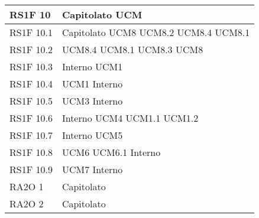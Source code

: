 \begin{center}
\begin{longtable}{ | p{5cm} | p{5cm} |}
        RS1F 10 &  Capitolato \newline  UCM \newline  \\ \hline      
        RS1F 10.1 &  Capitolato \newline  UCM8 \newline  UCM8.2 \newline  UCM8.4 \newline  UCM8.1 \newline  \\ \hline      
        RS1F 10.2 &  UCM8.4 \newline  UCM8.1 \newline  UCM8.3 \newline  UCM8 \newline  \\ \hline      
        RS1F 10.3 &  Interno \newline  UCM1 \newline  \\ \hline      
        RS1F 10.4 &  UCM1 \newline  Interno \newline  \\ \hline      
        RS1F 10.5 &  UCM3 \newline  Interno \newline  \\ \hline      
        RS1F 10.6 &  Interno \newline  UCM4 \newline  UCM1.1 \newline  UCM1.2 \newline  \\ \hline      
        RS1F 10.7 &  Interno \newline  UCM5 \newline  \\ \hline      
        RS1F 10.8 &  UCM6 \newline  UCM6.1 \newline  Interno \newline  \\ \hline      
        RS1F 10.9 &  UCM7 \newline  Interno \newline  \\ \hline      
        RA2O 1 &  Capitolato \newline  \\ \hline      
        RA2O 2 &  Capitolato \newline  \\ \hline      

\end{longtable}
\end{center}
